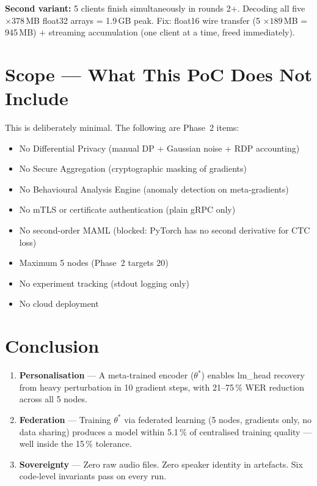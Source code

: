 \documentclass[11pt,a4paper]{article}
\theoremstyle{definition}
\begin{document}
\textbf{Second variant:} 5 clients finish simultaneously in rounds 2+.  Decoding
all five $\times 378$\,MB float32 arrays = 1.9\,GB peak.  Fix: float16 wire
transfer (5 $\times 189$\,MB = 945\,MB) + streaming accumulation (one client at a
time, freed immediately).

\section{Scope --- What This PoC Does Not Include}

\label{sec:scope}

This is deliberately minimal.  The following are Phase~2 items:

\begin{itemize}[leftmargin=*,itemsep=2pt]
  \item No Differential Privacy (manual DP + Gaussian noise + RDP accounting)
  \item No Secure Aggregation (cryptographic masking of gradients)
  \item No Behavioural Analysis Engine (anomaly detection on meta-gradients)
  \item No mTLS or certificate authentication (plain gRPC only)
  \item No second-order MAML (blocked: PyTorch has no second derivative for CTC
        loss)
  \item Maximum 5 nodes (Phase~2 targets 20)
  \item No experiment tracking (stdout logging only)
  \item No cloud deployment
\end{itemize}

\section{Conclusion}

\label{sec:conclusion}

\begin{resultbox}
\begin{enumerate}[leftmargin=*,itemsep=4pt]
  \item \textbf{Personalisation} --- A meta-trained encoder ($\theta^*$) enables
        lm\_head recovery from heavy perturbation in 10 gradient steps, with
        21--75\,\% WER reduction across all 5 nodes.
  \item \textbf{Federation} --- Training $\theta^*$ via federated learning (5
        nodes, gradients only, no data sharing) produces a model within 5.1\,\% of
        centralised training quality --- well inside the 15\,\% tolerance.
  \item \textbf{Sovereignty} --- Zero raw audio files.  Zero speaker identity in
        artefacts.  Six code-level invariants pass on every run.
\end{enumerate}
\end{resultbox}
\end{document}
